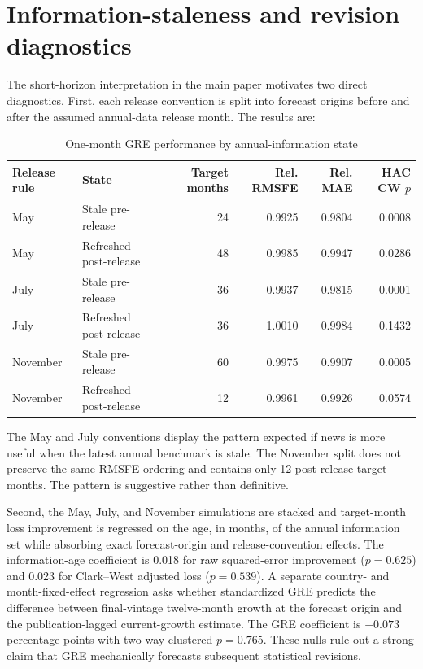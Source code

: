 \documentclass[12pt]{article}
\begin{document}
\section{Information-staleness and revision diagnostics}
The short-horizon interpretation in the main paper motivates two direct diagnostics. First, each release convention is split into forecast origins before and after the assumed annual-data release month. The results are:
\begin{table}[htbp]
\centering\scriptsize
\caption{One-month GRE performance by annual-information state}
\begin{tabular}{llrrrr}
\toprule
Release rule & State & Target months & Rel. RMSFE & Rel. MAE & HAC CW $p$\\
\midrule
May & Stale pre-release & 24 & 0.9925 & 0.9804 & 0.0008\\
May & Refreshed post-release & 48 & 0.9985 & 0.9947 & 0.0286\\
July & Stale pre-release & 36 & 0.9937 & 0.9815 & 0.0001\\
July & Refreshed post-release & 36 & 1.0010 & 0.9984 & 0.1432\\
November & Stale pre-release & 60 & 0.9975 & 0.9907 & 0.0005\\
November & Refreshed post-release & 12 & 0.9961 & 0.9926 & 0.0574\\
\bottomrule
\end{tabular}
\end{table}
The May and July conventions display the pattern expected if news is more useful when the latest annual benchmark is stale. The November split does not preserve the same RMSFE ordering and contains only 12 post-release target months. The pattern is suggestive rather than definitive.

Second, the May, July, and November simulations are stacked and target-month loss improvement is regressed on the age, in months, of the annual information set while absorbing exact forecast-origin and release-convention effects. The information-age coefficient is 0.018 for raw squared-error improvement ($p=0.625$) and 0.023 for Clark--West adjusted loss ($p=0.539$). A separate country- and month-fixed-effect regression asks whether standardized GRE predicts the difference between final-vintage twelve-month growth at the forecast origin and the publication-lagged current-growth estimate. The GRE coefficient is $-0.073$ percentage points with two-way clustered $p=0.765$. These nulls rule out a strong claim that GRE mechanically forecasts subsequent statistical revisions.
\end{document}
